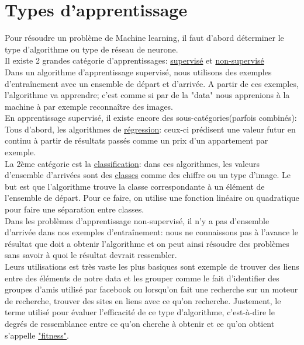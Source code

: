 \documentclass[openany,14pt,fleqn]{book} %
\begin{document}
\section{Types d'apprentissage}
Pour résoudre un problème de Machine learning, il faut d'abord déterminer le type d'algorithme ou type de réseau de neurone.\\
Il existe 2 grandes catégorie d'apprentissages: \underline{supervisé} et \underline{non-supervisé}\\ \break
Dans un algorithme d'apprentissage supervisé, nous utilisons des exemples d'entraînement avec un ensemble de départ et d'arrivée. A partir de ces exemples, l'algorithme va apprendre; c'est comme si par de la "data" nous apprenions à la machine à par exemple reconnaître des images.\\
En apprentissage supervisé, il existe encore des sous-catégories(parfois combinés):\\
Tous d'abord, les algorithmes de \underline{régression}: ceux-ci prédisent une valeur futur en continu à partir de résultats passés comme un prix d'un appartement par exemple.\\
La 2ème catégorie est la \underline{classification}: dans ces algorithmes, les valeurs d'ensemble d'arrivées sont des \underline{classes} comme des chiffre ou un type d'image. Le but est que l’algorithme trouve la classe correspondante à un élément de l’ensemble de départ. Pour ce faire, on utilise une fonction linéaire ou quadratique pour faire une séparation entre classes.\\ \break
Dans les problèmes d'apprentissage non-supervisé, il n'y a pas d'ensemble d'arrivée dans nos exemples d’entraînement: nous ne connaissons pas à l'avance le résultat que doit a obtenir l'algorithme et on peut ainsi résoudre des problèmes sans savoir à quoi le résultat devrait ressembler.\\
Leurs utilisations est très vaste les plus basiques sont exemple de trouver des liens entre des éléments de notre data et les grouper comme le fait d'identifier des groupes d'amis utilisé par facebook ou lorsqu'on fait une recherche sur un moteur de recherche, trouver des sites en liens avec ce qu'on recherche. Justement, le terme utilisé pour évaluer l'efficacité de ce type d'algorithme, c'est-à-dire le degrés de ressemblance entre ce qu'on cherche à obtenir et ce qu'on obtient s'appelle \underline{"fitness"}.\cite{Wikipedia_def}
\end{document}
